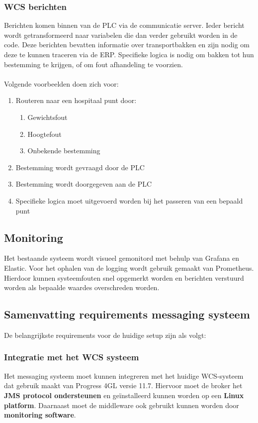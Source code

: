 \subsubsection{WCS berichten} 
Berichten komen binnen van de PLC via de communicatie server. Ieder bericht wordt getransformeerd naar variabelen die dan verder gebruikt worden in de code.
Deze berichten bevatten informatie over transportbakken en zijn nodig om deze te kunnen traceren via de ERP.
Specifieke logica is nodig om bakken tot hun bestemming te krijgen, of om fout afhandeling te voorzien.
\\\\
Volgende voorbeelden doen zich voor:
\begin{enumerate}
\item Routeren naar een hospitaal punt door: 
\begin{enumerate}
  \item Gewichtsfout
  \item Hoogtefout
  \item Onbekende bestemming
\end{enumerate}
\item Bestemming wordt gevraagd door de PLC
\item Bestemming wordt doorgegeven aan de PLC 
\item Specifieke logica moet uitgevoerd worden bij het passeren van een bepaald punt
\end{enumerate}

\subsection{Monitoring}
Het bestaande systeem wordt visueel gemonitord met behulp van Grafana en Elastic. 
Voor het ophalen van de logging wordt gebruik gemaakt van Prometheus.
Hierdoor kunnen systeemfouten snel opgemerkt worden en berichten verstuurd worden als bepaalde waardes overschreden worden.
\newpage

\subsection{Samenvatting requirements messaging systeem}
De belangrijkste requirements voor de huidige setup zijn als volgt:

\subsubsection{Integratie met het WCS systeem}
Het messaging systeem moet kunnen integreren met het huidige WCS-systeem dat gebruik maakt van Progress 4GL versie 11.7. 
Hiervoor moet de broker het \textbf{JMS protocol ondersteunen} en geïnstalleerd kunnen worden op een \textbf{Linux platform}.
Daarnaast moet de middleware ook gebruikt kunnen worden door \textbf{monitoring software}.

